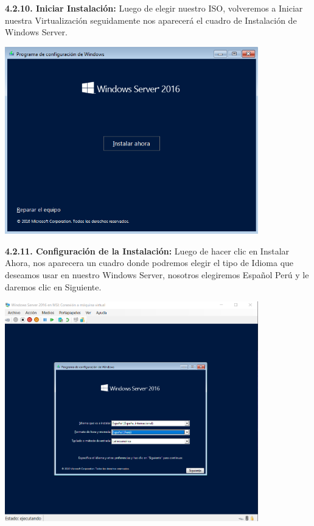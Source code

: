 \textbf {4.2.10. Iniciar Instalación:} Luego de elegir nuestro ISO, volveremos a Iniciar nuestra Virtualización seguidamente nos aparecerá el cuadro de Instalación de Windows Server.
\begin{center}
  \includegraphics[width=11cm]{Imagenes/Instalar_Ahora.png}
\end{center}
\break

\textbf {4.2.11. Configuración de la Instalación:} Luego de hacer clic en Instalar Ahora, nos aparecera un cuadro donde podremos elegir el tipo de Idioma que deseamos usar en nuestro Windows Server, nosotros elegiremos Español Perú y le daremos clic en Siguiente.
\begin{center}
  \includegraphics[width=11cm]{Imagenes/Iniciar_Instalacion.png}
\end{center}

